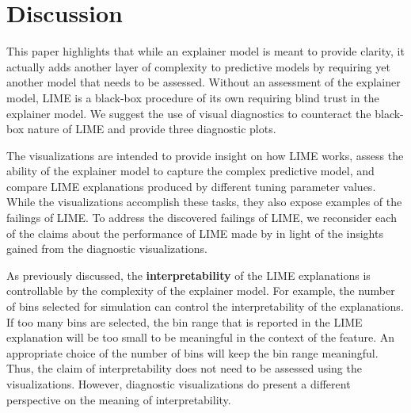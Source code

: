 \documentclass[AMS,STIX2COL]{WileyNJD-v2}\usepackage[]{graphicx}\usepackage[]{color}
\renewcommand{\sout}[1]{\unskip}
\begin{document}
\sout{Without applying LIME with multiple tuning parameter values to the bullet test data or viewing diagnostic plots of the LIME explanations, it may be very possible to formulate reasons why the LIME explanations make sense. However, the sequence of plots in this section (Figures \ref{fig:figure-09}, \ref{fig:figure-10}, and \ref{fig:figure-11}) suggest that we should be cautious to trust any of these LIME explanations. It appears that either LIME needs to be further tuned to provide trustworthy and good explanations, or a different approach may provide better insight.}

\section{Discussion} \label{discussion}

This paper highlights that while an explainer model is meant to provide clarity, it actually adds another layer of complexity to predictive models by requiring yet another model that needs to be assessed. Without an assessment of the explainer model, LIME is a black-box procedure of its own requiring blind trust in the explainer model. We suggest the use of visual diagnostics to counteract the black-box nature of LIME and provide three diagnostic plots.

The visualizations are intended to provide insight on how LIME works, assess the ability of the explainer model to capture the complex predictive model, and compare LIME explanations produced by different tuning parameter values. While the visualizations accomplish these tasks, they also expose examples of the failings of LIME. To address the discovered failings of LIME, we reconsider each of the claims about the performance of LIME made by \citet{ribeiro:2016} in light of the insights gained from the diagnostic visualizations.

As previously discussed, the \textbf{interpretability} of the LIME explanations is controllable  by the complexity of the explainer model. For example, the number of bins selected for simulation can control the interpretability of the explanations. If too many bins are selected, the bin range that is reported in the LIME explanation will be too small to be meaningful in the context of the feature. An appropriate choice of the number of bins will keep the bin range meaningful. Thus, the claim of interpretability does not need to be assessed using the visualizations. However, diagnostic visualizations do present a different perspective on the meaning of interpretability.
\end{document}

